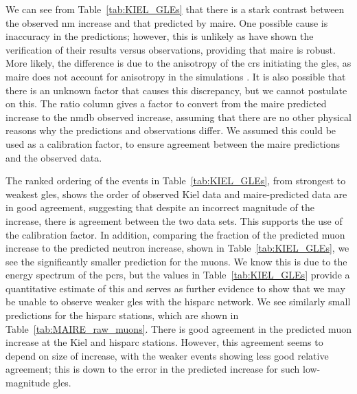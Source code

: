 We can see from Table~\ref{tab:KIEL_GLEs} that there is a stark contrast between the observed \gls{nm} increase and that predicted by \gls{maire}. One possible cause is inaccuracy in the predictions; however, this is unlikely as \citet{lei_atmospheric_2004} have shown the verification of their results versus observations, providing that \gls{maire} is robust. More likely, the difference is due to the anisotropy of the \glspl{cr} initiating the \glspl{gle}, as \gls{maire} does not account for anisotropy in the simulations \citep{dyer_calculations_2003, lei_atmospheric_2004}. It is also possible that there is an unknown factor that causes this discrepancy, but we cannot postulate on this. The ratio column gives a factor to convert from the \gls{maire} predicted increase to the \gls{nmdb} observed increase, assuming that there are no other physical reasons why the predictions and observations differ. We assumed this could be used as a calibration factor, to ensure agreement between the \gls{maire} predictions and the observed data.

The ranked ordering of the events in Table~\ref{tab:KIEL_GLEs}, from strongest to weakest \glspl{gle}, shows the order of observed Kiel data and \gls{maire}-predicted data are in good agreement, suggesting that despite an incorrect magnitude of the increase, there is agreement between the two data sets. This supports the use of the calibration factor. In addition, comparing the fraction of the predicted muon increase to the predicted neutron increase, shown in Table~\ref{tab:KIEL_GLEs}, we see the significantly smaller prediction for the muons. We know this is due to the energy spectrum of the \glspl{pcr}, but the values in Table~\ref{tab:KIEL_GLEs} provide a quantitative estimate of this and serves as further evidence to show that we may be unable to observe weaker \glspl{gle} with the \gls{hisparc} network. We see similarly small predictions for the \gls{hisparc} stations, which are shown in Table~\ref{tab:MAIRE_raw_muons}. There is good agreement in the predicted muon increase at the Kiel and \gls{hisparc} stations. However, this agreement seems to depend on size of increase, with the weaker events showing less good relative agreement; this is down to the error in the predicted increase for such low-magnitude \glspl{gle}.

\vspace{1em}

